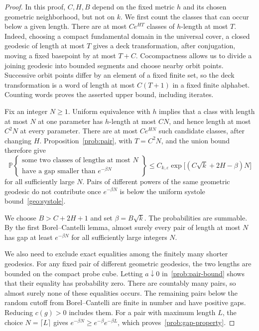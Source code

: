 \documentclass[10pt,oneside,reqno]{amsproc}
\numberwithin{equation}{section}
\theoremstyle{definition}
\theoremstyle{remark}
\newcommand{\eps}{\varepsilon}
\renewcommand{\ge}{\geqslant}
\renewcommand{\le}{\leqslant}
\begin{document}
\begin{proof}
In this proof, $C,H,B$ depend on the fixed metric $h$ and its chosen geometric neighborhood, but not on $k$. We first count the classes that can occur below a given length. There are at most $Ce^{HT}$ classes of $h$-length at most $T$. Indeed, choosing a compact fundamental domain in the universal cover, a closed geodesic of length at most $T$ gives a deck transformation, after conjugation, moving a fixed basepoint by at most $T+C$. Cocompactness allows us to divide a joining geodesic into bounded segments and choose nearby orbit points. Successive orbit points differ by an element of a fixed finite set, so the deck transformation is a word of length at most $C(T+1)$ in a fixed finite alphabet. Counting words proves the asserted upper bound, including iterates.

Fix an integer $N\ge1$. Uniform equivalence with $h$ implies that a class with length at most $N$ at one parameter has $h$-length at most $CN$, and hence length at most $C^2N$ at every parameter. There are at most $Ce^{HN}$ such candidate classes, after changing $H$. Proposition~\ref{prob:pair}, with $T=C^2N$, and the union bound therefore give
\[
 \mathbb P\left\{\begin{array}{c}\text{some two classes of lengths at most }N\\\text{have a gap smaller than }e^{-\beta N}\end{array}\right\}\le C_{k,\eps}\exp\bigl[(C\sqrt{k}+2H-\beta)N\bigr]
\]
for all sufficiently large $N$. Pairs of different powers of the same geometric geodesic do not contribute once $e^{-\beta N}$ is below the uniform systole bound~\eqref{geo:systole}.

We choose $B>C+2H+1$ and set $\beta=B\sqrt{k}$. The probabilities are summable. By the first Borel--Cantelli lemma, almost surely every pair of length at most $N$ has gap at least $e^{-\beta N}$ for all sufficiently large integers $N$.

We also need to exclude exact equalities among the finitely many shorter geodesics. For any fixed pair of different geometric geodesics, the two lengths are bounded on the compact probe cube. Letting $a\downarrow0$ in~\eqref{prob:pair-bound} shows that their equality has probability zero. There are countably many pairs, so almost surely none of these equalities occurs. The remaining pairs below the random cutoff from Borel--Cantelli are finite in number and have positive gaps. Reducing $c(g)>0$ includes them. For a pair with maximum length $L$, the choice $N=\lceil L\rceil$ gives $e^{-\beta N}\ge e^{-\beta}e^{-\beta L}$, which proves~\eqref{prob:gap-property}.
\end{proof}
\end{document}

